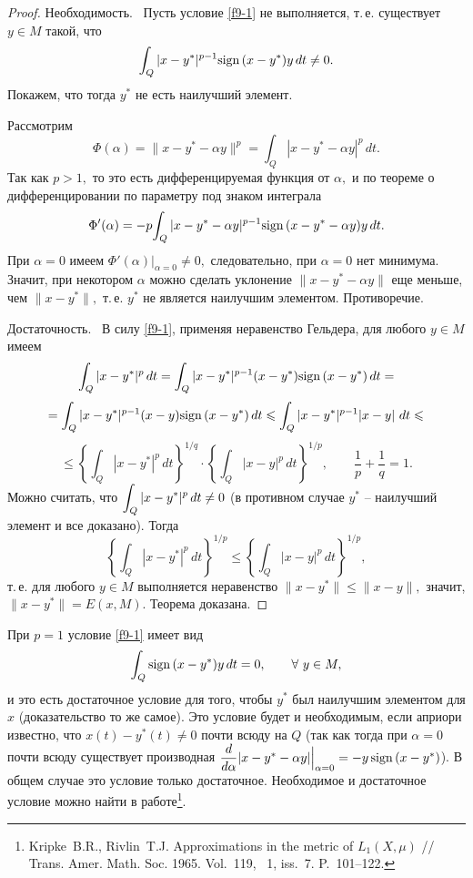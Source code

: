  \begin{proof} %
 Н\;е\;о\;б\;х\;о\;д\;и\;м\;о\;с\;т\;ь.~ Пусть условие \eqref{f9-1}
 не выполняется, т.\,е. существует $y\in M$ такой, что
 $$
 {\int_Q |x-y^*|^{p-1} {\rm sign \, } (x-y^*)y\, dt\ne 0.}
 $$
 Покажем, что тогда $y^*$ не есть наилучший элемент.

 Рассмотрим
 $$
 \Phi(\alpha)=\|x-y^*-\alpha y\|^p={\int_Q |x-y^*-\alpha y|^p\, dt.}
 $$
 Так как $p>1,$ то это есть дифференцируемая функция от $\alpha,$
 и по теореме о дифференцировании по параметру под
 знаком интеграла
 $$
 \Phi'(\alpha)=-p {\int_Q |x-y^*-\alpha y|^{p-1}{\rm sign \, }(x-y^*-\alpha y)y\, dt.}
 $$
 При $\alpha=0$ имеем $\Phi'(\alpha)|_{\alpha=0}\ne 0,$
 следовательно, при $\alpha=0$ нет минимума. Значит, при некотором
 $\alpha$ можно сделать уклонение $\|x-y^*-\alpha y\|$ еще меньше, чем
 $\|x-y^*\|,$ т.\,е. $y^*$ не является наилучшим элементом. Противоречие.

 Д\;о\;с\;т\;а\;т\;о\;ч\;н\;о\;с\;т\;ь.~ В силу \eqref{f9-1}, применяя неравенство
 Гельдера,  {для любого} {$y \in M$}
 имеем
 $$
 \int_Q |x-y^*|^{p}\, dt=\int_Q |x-y^*|^{p-1}(x-y^*){\rm sign \, }(x-y^*)\, dt=
 $$
 $$
 =\int_Q |x-y^*|^{p-1}(x-y){\rm sign \, }(x-y^*)\, dt \leqslant \int_Q |x-y^*|^{p-1}|x-y|\
 dt\leqslant
 $$
 $$
 \le \left\{ \int_Q |x-y^*|^{p}\, dt \right\}^{1/q}\cdot
 \left\{ \int_Q |x-y|^{p}\, dt \right\}^{1/p},\qquad
 {\frac{1}{p}+\frac{1}{q}=1}.
 $$
 Можно считать, что $\displaystyle\int_Q |x-y^*|^{p}\, dt\ne 0$ (в противном случае
 $y^*$ -- наилучший элемент и все доказано). Тогда
 $$
 \left\{ \int_Q |x-y^*|^{p}\, dt \right\}^{1/p}\le
 \left\{ \int_Q |x-y|^{p}\, dt \right\}^{1/p},
 $$
 т.\,е. для любого $y\in M$ выполняется неравенство $\|x-y^*\|\le \|x-y\|,$ значит,
 $\|x-y^*\|=E(x,M).$
 Теорема доказана.
 \end{proof}

 \begin{Remark} %
 При $p=1$ {условие} \eqref{f9-1} имеет вид
\begin{equation}\label{f9-2}
 \int_Q {\rm sign \, }(x-y^*)y\, dt=0,\qquad \forall\  y\in M,
\end{equation}
 и это есть достаточное условие для того, чтобы $y^*$
 был наилучшим элементом для $x$ (доказательство то же самое).
 Это условие будет и необходимым, если априори известно, что
 $x(t)-y^*(t)\ne 0$ почти всюду на $Q$ (так как тогда при $\alpha=0$ почти всюду существует
 производная $\dfrac{d}{d\alpha}|x-y^*-\alpha y|\Big|_{\alpha=0}=-y
 \, {\rm sign \, }(x-y^*)$). В общем случае это условие только
 достаточное. Необходимое и достаточное условие можно найти
 в работе\footnote{Kripke~B.R., Rivlin~T.J. Approximations in the metric of $L_1(X,\mu)$ //
 Trans. Amer. Math. Soc. 1965. Vol.~119, \textnumero~1, iss.~7.
 P.~101--122.}.
 \end{Remark}

